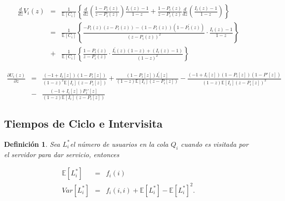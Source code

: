 \documentclass{article}
\newtheorem{Def}{Definición}
\newcommand{\esp}{\mathbb{E}}
\begin{document}
\begin{eqnarray*}
\frac{d}{dz}V_{i}\left(z\right)&=&\frac{1}{\esp\left[C_{i}\right]}\left\{\frac{d}{dz}\left(\frac{1-P_{i}\left(z\right)}{z-P_{i}\left(z\right)}\right)\frac{I_{i}\left(z\right)-1}{1-z}+\frac{1-P_{i}\left(z\right)}{z-P_{i}\left(z\right)}\frac{d}{dz}\left(\frac{I_{i}\left(z\right)-1}{1-z}\right)\right\}\\
&=&\frac{1}{\esp\left[C_{i}\right]}\left\{\frac{-P_{i}\left(z\right)\left(z-P_{i}\left(z\right)\right)-\left(1-P_{i}\left(z\right)\right)\left(1-P_{i}^{'}\left(z\right)\right)}{\left(z-P_{i}\left(z\right)\right)^{2}}\cdot\frac{I_{i}\left(z\right)-1}{1-z}\right\}\\
&+&\frac{1}{\esp\left[C_{i}\right]}\left\{\frac{1-P_{i}\left(z\right)}{z-P_{i}\left(z\right)}\cdot\frac{I_{i}^{'}\left(z\right)\left(1-z\right)+\left(I_{i}\left(z\right)-1\right)}{\left(1-z\right)^{2}}\right\}
\end{eqnarray*}


\begin{eqnarray*}
\frac{\partial U_{i}\left(z\right)}{\partial z}&=&\frac{(-1+I_{i}[z]) (1-P_{i}[z])}{(1-z)^2 \esp[I_{i}] (z-P_{i}[z])}+\frac{(1-P_{i}[z]) I_{i}^{'}[z]}{(1-z) \esp[I_{i}] (z-P_{i}[z])}-\frac{(-1+I_{i}[z]) (1-P_{i}[z])\left(1-P{'}[z]\right)}{(1-z) \esp[I_{i}] (z-P_{i}[z])^2}\\
&-&\frac{(-1+I_{i}[z]) P_{i}{'}[z]}{(1-z) \esp[I_{i}](z-P_{i}[z])}
\end{eqnarray*}

\subsection{Tiempos de Ciclo e Intervisita}


\begin{Def}
Sea $L_{i}^{*}$el n\'umero de usuarios en la cola $Q_{i}$ cuando es visitada por el servidor para dar servicio, entonces

\begin{eqnarray}
\esp\left[L_{i}^{*}\right]&=&f_{i}\left(i\right)\\
Var\left[L_{i}^{*}\right]&=&f_{i}\left(i,i\right)+\esp\left[L_{i}^{*}\right]-\esp\left[L_{i}^{*}\right]^{2}.
\end{eqnarray}

\end{Def}
\end{document}
